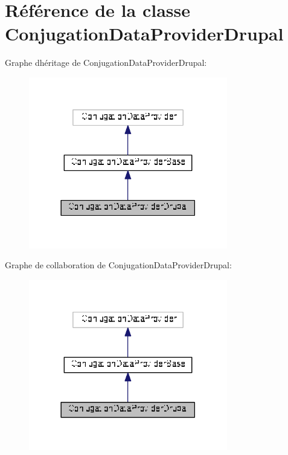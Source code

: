 \hypertarget{class_conjugation_data_provider_drupal}{}\section{Référence de la classe Conjugation\+Data\+Provider\+Drupal}
\label{class_conjugation_data_provider_drupal}


Graphe d\textquotesingle{}héritage de Conjugation\+Data\+Provider\+Drupal\+:
\nopagebreak
\begin{figure}[H]
\begin{center}
\leavevmode
\includegraphics[width=246pt]{class_conjugation_data_provider_drupal__inherit__graph}
\end{center}
\end{figure}


Graphe de collaboration de Conjugation\+Data\+Provider\+Drupal\+:
\nopagebreak
\begin{figure}[H]
\begin{center}
\leavevmode
\includegraphics[width=246pt]{class_conjugation_data_provider_drupal__coll__graph}
\end{center}
\end{figure}
